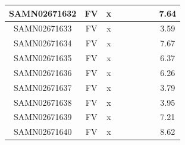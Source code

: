 \documentclass[../main.tex]{subfiles}
\begin{document}
\begin{flushleft}
\begin{footnotesize}
\begin{longtable}{|c|c|c|c|c|c|c|}
    \hline
    SAMN02671632  & FV    & x                                                            & ~          & ~                                                                           & ~                                                                 & 7.64      \\ 
    \hline
    SAMN02671633  & FV    & x                                                            & ~          & ~                                                                           & ~                                                                 & 3.59      \\ 
    \hline
    SAMN02671634  & FV    & x                                                            & ~          & ~                                                                           & ~                                                                 & 7.67      \\ 
    \hline
    SAMN02671635  & FV    & x                                                            & ~          & ~                                                                           & ~                                                                 & 6.37      \\ 
    \hline
    SAMN02671636  & FV    & x                                                            & ~          & ~                                                                           & ~                                                                 & 6.26      \\ 
    \hline
    SAMN02671637  & FV    & x                                                            & ~          & ~                                                                           & ~                                                                 & 3.79      \\ 
    \hline
    SAMN02671638  & FV    & x                                                            & ~          & ~                                                                           & ~                                                                 & 3.95      \\ 
    \hline
    SAMN02671639  & FV    & x                                                            & ~          & ~                                                                           & ~                                                                 & 7.21      \\ 
    \hline
    SAMN02671640  & FV    & x                                                            & ~          & ~                                                                           & ~                                                                 & 8.62      \\ 

\end{longtable}
\end{footnotesize}
\end{flushleft}
\end{document}

